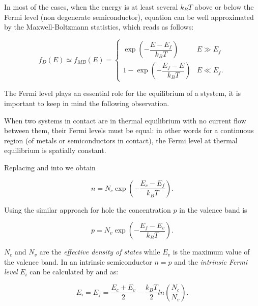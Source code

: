 In most of the cases, when the energy is at least several $k_BT$ above or below the Fermi level (non degenerate semiconductor), equation  can be well approximated by the Maxwell-Boltzmann statistics, which reads as follows:

\begin{equation}
\label{eq: maxwell distribution}
f_D(E)\simeq f_{MB}(E) = 
\begin{cases}
\exp\left(-\dfrac{E-E_f}{k_B T}\right) & E\gg E_f \\
1-\exp\left(-\dfrac{E_f-E}{k_BT}\right) & E \ll E_f .
\end{cases}
\end{equation}

The Fermi level plays an essential role for the equilibrium of a stystem, it is important to keep in mind the following observation.

\begin{Osservazione}
When two systems in contact are in thermal equilibrium with no current flow between them, their Fermi levels must be equal: in other words for a continuous region (of metals or semiconductors in contact), the Fermi level at thermal equilibrium is spatially constant.
\end{Osservazione}

Replacing  and  into  we obtain

\begin{equation}
n = N_c \exp\left(-\dfrac{E_c-E_f}{k_BT}\right). \label{eq: n density fd}
\end{equation}

Using the similar approach for hole the concentration $p$ in the valence band is

\begin{equation}
p = N_v \exp\left(-\dfrac{E_f-E_v}{k_B T}\right).  \label{eq: p density fd}
\end{equation}

$N_c$ and $N_v$ are the \textit{effective density of states} while $E_v$ is the maximum value of the valence band.
In an intrinsic semiconductor $n=p$ and the \textit{intrinsic Fermi level} $E_i$ can be calculated by  and  as:

\begin{equation}
\label{eq: midgap equilibrium}
E_i=E_f=\dfrac{E_c+E_v}{2} - \dfrac{k_B T}{2}ln\left(\dfrac{N_c}{N_v}\right).
\end{equation}

